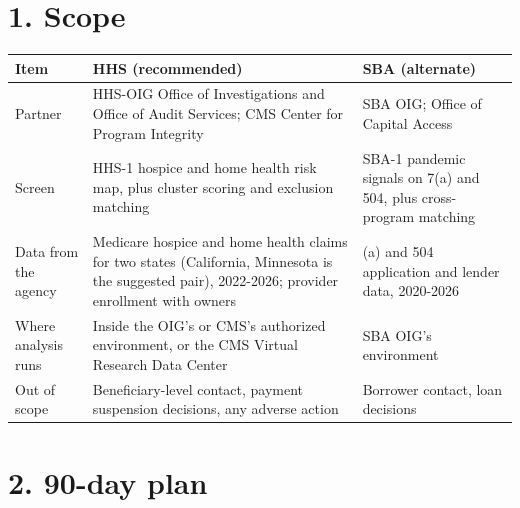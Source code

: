 \documentclass[letterpaper,11pt]{article}
\begin{document}
\hypertarget{scope}{%
\section*{1. Scope}\label{scope}}

\begingroup\small\setlength{\tabcolsep}{4pt}\renewcommand{\arraystretch}{1.25}
\begin{longtable}[l]{@{}>{\raggedright\arraybackslash}p{}>{\raggedright\arraybackslash}p{}>{\raggedright\arraybackslash}p{}@{}}
\rowcolor{coolblack}\leavevmode\color{white}\bfseries Item & \leavevmode\color{white}\bfseries HHS (recommended) & \leavevmode\color{white}\bfseries SBA (alternate) \\
\endhead
Partner & HHS-OIG Office of Investigations and Office of Audit Services; CMS Center for Program Integrity & SBA OIG; Office of Capital Access \\
Screen & HHS-1 hospice and home health risk map, plus cluster scoring and exclusion matching & SBA-1 pandemic signals on 7(a) and 504, plus cross-program matching \\
Data from the agency & Medicare hospice and home health claims for two states (California, Minnesota is the suggested pair), 2022-2026; provider enrollment with owners & 7(a) and 504 application and lender data, 2020-2026 \\
Where analysis runs & Inside the OIG's or CMS's authorized environment, or the CMS Virtual Research Data Center & SBA OIG's environment \\
Out of scope & Beneficiary-level contact, payment suspension decisions, any adverse action & Borrower contact, loan decisions \\
\end{longtable}\endgroup

\hypertarget{day-plan}{%
\section*{2. 90-day plan}\label{day-plan}}
\end{document}
